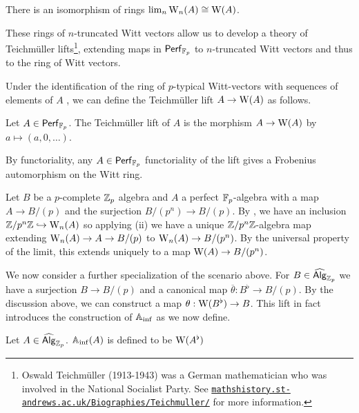 \begin{remark}
    There is an isomorphism of rings $\lim_{n}\mathrm{W}_{n}(A)\cong\mathrm{W}(A)$. 
\end{remark}
These rings of $n$-truncated Witt vectors allow us to develop a theory of Teichm\"{u}ller lifts\footnote{Oswald Teichm\"{u}ller (1913-1943) was a German mathematician who was involved in the National Socialist Party. See \href{https://mathshistory.st-andrews.ac.uk/Biographies/Teichmuller/}{\texttt{mathshistory.st-andrews.ac.uk/Biographies/Teichmuller/}} for more information.}, extending maps in $\mathsf{Perf}_{\mathbb{F}_{p}}$ to $n$-truncated Witt vectors and thus to the ring of Witt vectors. 

Under the identification of the ring of $p$-typical Witt-vectors with sequences of elements of $A$ \cite[Def. 3.1.6, 3.2.4]{Kedlaya}, we can define the Teichm\"{u}ller lift $A\to\mathrm{W}(A)$ as follows. 
\begin{definition}\label{def: Teichmuller lift}
    Let $A\in\mathsf{Perf}_{\mathbb{F}_{p}}$. The Teichm\"{u}ller lift of $A$ is the morphism $A\to\mathrm{W}(A)$ by $a\mapsto(a,0,\dots)$. 
\end{definition}
\begin{remark}\label{rmk: Frobenius lift on Witt vectors}
    By functoriality, any $A\in\mathsf{Perf}_{\mathbb{F}_{p}}$ functoriality of the lift gives a Frobenius automorphism on the Witt ring. 
\end{remark}

Let $B$ be a $p$-complete $\mathbb{Z}_{p}$ algebra and $A$ a perfect $\mathbb{F}_{p}$-algebra with a map $A\to B/(p)$ and the surjection $B/(p^{n})\to B/(p)$. By , we have an inclusion $\mathbb{Z}/p^{n}\mathbb{Z}\hookrightarrow\mathrm{W}_{n}(A)$ so applying  (ii) we have a unique $\mathbb{Z}/p^{n}\mathbb{Z}$-algebra map extending $\mathrm{W}_{n}(A)\to A\to B/(p)$ to $\mathrm{W}_{n}(A)\to B/(p^{n})$. By the universal property of the limit, this extends uniquely to a map $\mathrm{W}(A)\to B/(p^{n})$. 

We now consider a further specialization of the scenario above. For $B\in\widehat{\mathsf{Alg}}_{\mathbb{Z}_{p}}$ we have a surjection $B\to B/(p)$ and a canonical map $\overline{\theta}:B^{\flat}\to B/(p)$. By the discussion above, we can construct a map $\theta:\mathrm{W}(B^{\flat})\to B$. This lift in fact introduces the construction of $\A_{\inf}$ as we now define. 
\begin{definition}[$\A_{\inf}$]\label{def: Ainf}
    Let $A\in\widehat{\mathsf{Alg}}_{\mathbb{Z}_{p}}$. $\mathbb{A}_{\inf}(A)$ is defined to be $\mathrm{W}(A^{\flat})$
\end{definition}